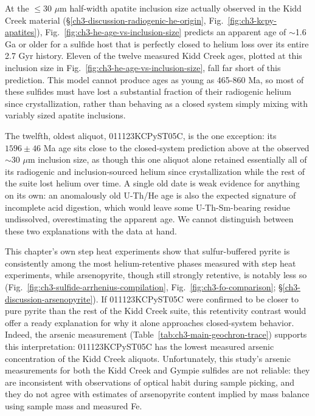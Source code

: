 At the $\leq$30 $\mu$m half-width apatite inclusion size actually
observed in the Kidd Creek material (\S\ref{ch3-discussion-radiogenic-he-origin},
Fig.~\ref{fig:ch3-kcpy-apatites}), Fig.~\ref{fig:ch3-he-age-vs-inclusion-size}
predicts an apparent age of $\sim$1.6 Ga or older for a sulfide host that is
perfectly closed to helium loss over its entire 2.7 Gyr history. Eleven
of the twelve measured Kidd Creek ages, plotted at this inclusion size
in Fig.~\ref{fig:ch3-he-age-vs-inclusion-size}, fall far short of this
prediction. This model cannot produce ages as young as 465-860 Ma, so most of these sulfides must 
have lost a substantial fraction of their radiogenic
helium since crystallization, rather than behaving as a closed system
simply mixing with variably sized apatite inclusions.

The twelfth, oldest aliquot, 011123KCPyST05C, is the one exception: its
$1596 \pm 46$ Ma age sits close to the closed-system prediction above at
the observed $\sim$30 $\mu$m inclusion size, as though this one aliquot
alone retained essentially all of its radiogenic and inclusion-sourced
helium since crystallization while the rest of the suite lost helium
over time. A single old date is weak evidence for anything on
its own: an anomalously old U-Th/He age is also the expected signature of
incomplete acid digestion, which would leave some U-Th-Sm-bearing residue undissolved, overestimating
the apparent age. We cannot distinguish between these two explanations with the data at hand. 

This chapter's own step heat experiments show that sulfur-buffered
pyrite is consistently among the most helium-retentive phases measured with step heat experiments,
while arsenopyrite, though still strongly retentive, is notably less so
(Fig.~\ref{fig:ch3-sulfide-arrhenius-compilation},
Fig.~\ref{fig:ch3-fo-comparison}; \S\ref{ch3-discussion-arsenopyrite}).
If 011123KCPyST05C were confirmed to be closer to pure pyrite than the
rest of the Kidd Creek suite, this retentivity contrast would offer a
ready explanation for why it alone approaches closed-system behavior. Indeed, the arsenic measurement
(Table~\ref{tab:ch3-main-geochron-trace}) supports this interpretation: 011123KCPyST05C has the
lowest measured arsenic concentration of the Kidd Creek aliquots. Unfortunately, this study's arsenic measurements for both the 
Kidd Creek and Gympie sulfides are not reliable: they are inconsistent with observations of optical habit during sample picking, 
and they do not agree with estimates of arsenopyrite content implied by mass balance using sample mass and measured Fe. 

